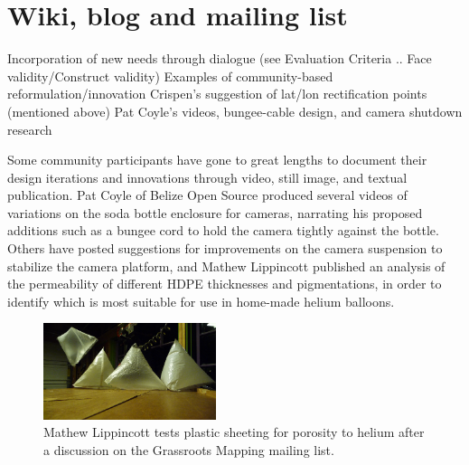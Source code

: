 \documentclass[11pt]{report}
\begin{document}
\section{Wiki, blog and mailing list}
        Incorporation of new needs through dialogue (see Evaluation Criteria .. Face validity/Construct validity)
        Examples of community-based reformulation/innovation
            Crispen's suggestion of lat/lon rectification points (mentioned above)
            Pat Coyle's videos, bungee-cable design, and camera shutdown research

Some community participants have gone to great lengths to document their design iterations and innovations through video, still image, and textual publication. Pat Coyle of Belize Open Source produced several videos of variations on the soda bottle enclosure for cameras, narrating his proposed additions such as a bungee cord to hold the camera tightly against the bottle. Others have posted suggestions for improvements on the camera suspension to stabilize the camera platform, and Mathew Lippincott published an analysis of the permeability of different HDPE thicknesses and pigmentations, in order to identify which is most suitable for use in home-made helium balloons.


\begin{figure}
	\begin{flushright}
		\includegraphics[width=0.45\textwidth]{images/mathew-lippincott-balloons.png}
		\caption{Mathew Lippincott tests plastic sheeting for porosity to helium after a discussion on the Grassroots Mapping mailing list.\cite{lippincott2010helium}}
	\end{flushright}
\end{figure}

\end{document}
